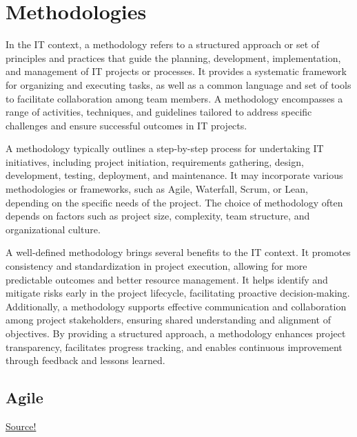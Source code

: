 \chapter{Methodologies}

In the IT context, a methodology refers to a structured approach or set of principles and practices that guide the planning, development, implementation, and management of IT projects or processes. It provides a systematic framework for organizing and executing tasks, as well as a common language and set of tools to facilitate collaboration among team members. A methodology encompasses a range of activities, techniques, and guidelines tailored to address specific challenges and ensure successful outcomes in IT projects.

A methodology typically outlines a step-by-step process for undertaking IT initiatives, including project initiation, requirements gathering, design, development, testing, deployment, and maintenance. It may incorporate various methodologies or frameworks, such as Agile, Waterfall, Scrum, or Lean, depending on the specific needs of the project. The choice of methodology often depends on factors such as project size, complexity, team structure, and organizational culture.

A well-defined methodology brings several benefits to the IT context. It promotes consistency and standardization in project execution, allowing for more predictable outcomes and better resource management. It helps identify and mitigate risks early in the project lifecycle, facilitating proactive decision-making. Additionally, a methodology supports effective communication and collaboration among project stakeholders, ensuring shared understanding and alignment of objectives. By providing a structured approach, a methodology enhances project transparency, facilitates progress tracking, and enables continuous improvement through feedback and lessons learned.

\section{Agile}

\href{https://www.atlassian.com/agile/manifesto}{Source!}\\

